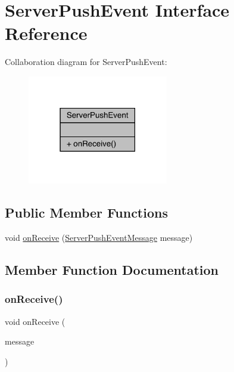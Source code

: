 \hypertarget{interfacecom_1_1toast_1_1android_1_1gamebase_1_1serverpush_1_1_server_push_event}{}\section{Server\+Push\+Event Interface Reference}
\label{interfacecom_1_1toast_1_1android_1_1gamebase_1_1serverpush_1_1_server_push_event}


Collaboration diagram for Server\+Push\+Event\+:
\nopagebreak
\begin{figure}[H]
\begin{center}
\leavevmode
\includegraphics[width=174pt]{interfacecom_1_1toast_1_1android_1_1gamebase_1_1serverpush_1_1_server_push_event__coll__graph}
\end{center}
\end{figure}
\subsection*{Public Member Functions}
\begin{DoxyCompactItemize}
\item 
void \hyperlink{interfacecom_1_1toast_1_1android_1_1gamebase_1_1serverpush_1_1_server_push_event_af7ad07c3768225f8107d20baa1ee7174}{on\+Receive} (\hyperlink{classcom_1_1toast_1_1android_1_1gamebase_1_1serverpush_1_1_server_push_event_message}{Server\+Push\+Event\+Message} message)
\end{DoxyCompactItemize}


\subsection{Member Function Documentation}
\mbox{\label{interfacecom_1_1toast_1_1android_1_1gamebase_1_1serverpush_1_1_server_push_event_af7ad07c3768225f8107d20baa1ee7174}} 
\subsubsection{\texorpdfstring{on\+Receive()}{onReceive()}}
{\footnotesize\ttfamily void on\+Receive (\begin{DoxyParamCaption}\item[{\hyperlink{classcom_1_1toast_1_1android_1_1gamebase_1_1serverpush_1_1_server_push_event_message}{Server\+Push\+Event\+Message}}]{message }\end{DoxyParamCaption})}

